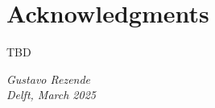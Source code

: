 \chapter*{Acknowledgments}

TBD

\begin{flushright}
{\makeatletter\itshape
    Gustavo Rezende \\
    Delft, March 2025
\makeatother}
\end{flushright}


